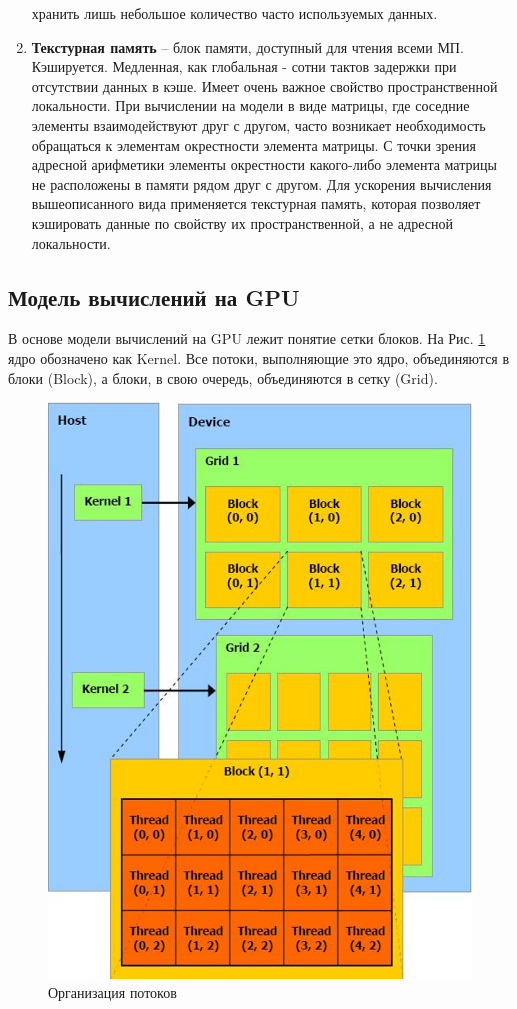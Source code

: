 \documentclass[a4paper, final]{article}
\begin{document}
\begin{enumerate}
    хранить лишь небольшое количество часто используемых данных.
    \item \textbf{Текстурная память} --  блок памяти, доступный для чтения всеми МП. Кэшируется. Медленная, как глобальная - сотни тактов задержки при 
    отсутствии данных в кэше. Имеет очень важное свойство пространственной локальности. При вычислении на модели в виде матрицы, где соседние
    элементы взаимодействуют друг с другом, часто возникает необходимость обращаться к элементам окрестности элемента матрицы. С точки зрения адресной арифметики элементы окрестности какого-либо элемента матрицы не расположены в памяти рядом друг с другом. Для ускорения вычисления вышеописанного вида применяется текстурная память, которая позволяет кэшировать данные по свойству их пространственной, а не адресной локальности.
    \end{enumerate}
    \subsection{Модель вычислений на GPU}
    В основе модели вычислений на GPU лежит понятие сетки блоков.  На Рис. \ref{threads} ядро обозначено как Kernel. Все потоки, выполняющие это ядро, объединяются в блоки (Block), а блоки, в свою очередь, объединяются в сетку (Grid).

    \clearpage
    \begin{figure}[h!]
    	\centering\includegraphics[scale=0.75]{threads.png}
         \caption{Организация потоков}	
     \label{threads}
    \end{figure}
    
\end{document}
